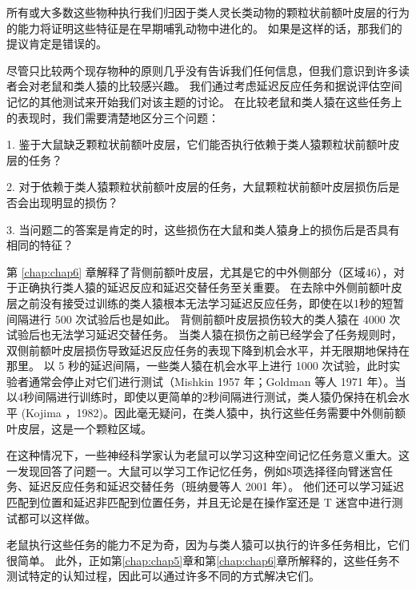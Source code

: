 所有或大多数这些物种执行我们归因于类人灵长类动物的颗粒状前额叶皮层的行为的能力将证明这些特征是在早期哺乳动物中进化的。
如果是这样的话，那我们的提议肯定是错误的。
\par


尽管只比较两个现存物种的原则几乎没有告诉我们任何信息，但我们意识到许多读者会对老鼠和类人猿的比较感兴趣。
我们通过考虑延迟反应任务和据说评估空间记忆的其他测试来开始我们对该主题的讨论。
在比较老鼠和类人猿在这些任务上的表现时，我们需要清楚地区分三个问题：
\par

1. 鉴于大鼠缺乏颗粒状前额叶皮层，它们能否执行依赖于类人猿颗粒状前额叶皮层的任务？ 
\par

2. 对于依赖于类人猿颗粒状前额叶皮层的任务，大鼠颗粒状前额叶皮层损伤后是否会出现明显的损伤？
\par

3. 当问题二的答案是肯定的时，这些损伤在大鼠和类人猿身上的损伤后是否具有相同的特征？
\par

第 \ref{chap:chap6} 章解释了背侧前额叶皮层，尤其是它的中外侧部分（区域46），对于正确执行类人猿的延迟反应和延迟交替任务至关重要。
在去除中外侧前额叶皮层之前没有接受过训练的类人猿根本无法学习延迟反应任务，即使在以1秒的短暂间隔进行 500 次试验后也是如此\cite{battig1960comparison}。
背侧前额叶皮层损伤较大的类人猿在 4000 次试验后也无法学习延迟交替任务\cite{goldman1978prenatal}。
当类人猿在损伤之前已经学会了任务规则时，双侧前额叶皮层损伤导致延迟反应任务的表现下降到机会水平，并无限期地保持在那里。 以 5 秒的延迟间隔，一些类人猿在机会水平上进行 1000 次试验，此时实验者通常会停止对它们进行测试（Mishkin 1957 年；Goldman 等人 1971 年）。当以4秒间隔进行训练时，即使以更简单的2秒间隔进行测试，类人猿仍保持在机会水平 (Kojima ，1982)。因此毫无疑问，在类人猿中，执行这些任务需要中外侧前额叶皮层，这是一个颗粒区域。
\par 
在这种情况下，一些神经科学家认为老鼠可以学习这种空间记忆任务意义重大。这一发现回答了问题一。大鼠可以学习工作记忆任务，例如8项选择径向臂迷宫任务\cite{olton1982disconnection,kesner1989retrospective}、延迟反应任务\cite{kolb1974double}和延迟交替任务\cite{thomas1980recovery}（班纳曼等人 2001 年）。
他们还可以学习延迟匹配到位置和延迟非匹配到位置任务，并且无论是在操作室\cite{sloan2006hippocampal}还是 T 迷宫\cite{dias2000effects}中进行测试都可以这样做。
\par


老鼠执行这些任务的能力不足为奇，因为与类人猿可以执行的许多任务相比，它们很简单。
此外，正如第\ref{chap:chap5}章和第\ref{chap:chap6}章所解释的，这些任务不测试特定的认知过程，因此可以通过许多不同的方式解决它们。
\par


